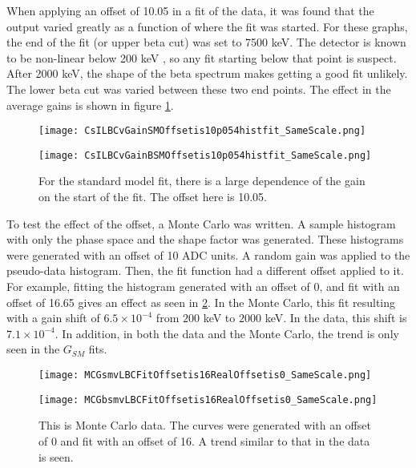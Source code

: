 \documentclass[../MaxHughesThesis.tex]{subfiles}
\begin{document}
When applying an offset of 10.05 in a fit of the data, it was found that the output varied greatly as a function of where the fit was started.
For these graphs, the end of the fit (or upper beta cut) was set to 7500 keV.
The detector is known to be non-linear below 200 keV \cite{Kno10}, so any fit starting below that point is suspect. 
After 2000 keV, the shape of the beta spectrum makes getting a good fit unlikely.
The lower beta cut was varied between these two end points.
The effect in the average gains is shown in figure \ref{fig:offset10LBCeffect}.

\begin{figure}
    \centering
    \begin{minipage}{0.50\textwidth}
        \centerline{\texttt{[image: CsILBCvGainSMOffsetis10p054histfit\_SameScale.png]}}
    \end{minipage}\hfill
    \begin{minipage}{0.50\textwidth}
        \centerline{\texttt{[image: CsILBCvGainBSMOffsetis10p054histfit\_SameScale.png]}}
    \end{minipage}
    \caption{For the standard model fit, there is a large dependence of the gain on the start of the fit.
	     The offset here is 10.05.}
    \label{fig:offset10LBCeffect}
\end{figure}

To test the effect of the offset, a Monte Carlo was written.
A sample histogram with only the phase space and the shape factor was generated. 
These histograms were generated with an offset of 10 ADC units.
A random gain was applied to the pseudo-data histogram. 
Then, the fit function had a different offset applied to it.
For example, fitting the histogram generated with an offset of 0, and fit with an offset of 16.65 gives an effect as seen in \ref{fig:MCoffset10applied20}.
In the Monte Carlo, this fit resulting with a gain shift of $6.5 \times 10^{-4}$ from $200$ keV to $2000$ keV.
In the data, this shift is $7.1 \times 10^{-4}$. 
In addition, in both the data and the Monte Carlo, the trend is only seen in the $G_{SM}$ fits.

\begin{figure}
	\centering
	\begin{minipage}{0.50\textwidth}
		\centerline{\texttt{[image: MCGsmvLBCFitOffsetis16RealOffsetis0\_SameScale.png]}}
	\end{minipage}\hfill
	\begin{minipage}{0.50\textwidth}
		\centerline{\texttt{[image: MCGbsmvLBCFitOffsetis16RealOffsetis0\_SameScale.png]}}
	\end{minipage}
	\caption{This is Monte Carlo data.
		 The curves were generated with an offset of 0 and fit with an offset of 16.
		 A trend similar to that in the data is seen.}
	\label{fig:MCoffset10applied20}
\end{figure}
\end{document}
